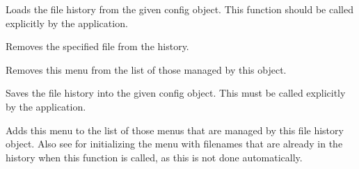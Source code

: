 
Loads the file history from the given config object. This function should be called explicitly by the application.




\label{wxfilehistoryfromfilefromhistory}


Removes the specified file from the history.

\label{wxfilehistoryremovemenu}


Removes this menu from the list of those managed by this object.


\label{wxfilehistorysave}


Saves the file history into the given config object. This must be called
explicitly by the application.




\label{wxfilehistoryusemenu}


Adds this menu to the list of those menus that are managed by this file history object.
Also see  for
initializing the menu with filenames that are already in the history when this
function is called, as this is not done automatically.


